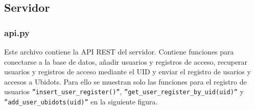 \documentclass{article}
\begin{document}
\subsection{Servidor}
\subsubsection{api.py}
Este archivo contiene la API REST del servidor.
Contiene funciones para conectarse a la base de datos, añadir usuarios y registros de acceso, recuperar usuarios y registros de acceso mediante el UID y enviar el registro de usarios y accesos a Ubidots.
Para ello se muestran solo las funciones para el registro de usuarios \texttt{''insert\_user\_register()''}, \texttt{''get\_user\_register\_by\_uid(uid)''} y \texttt{''add\_user\_ubidots(uid)''} en la siguiente figura.
\end{document}
